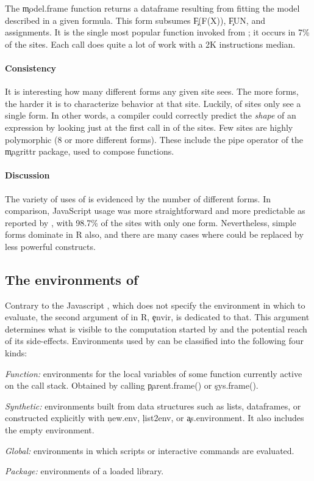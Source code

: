 \documentclass[review,screen,acmsmall,anonymous=true]{acmart}
\begin{document}
\medskip\noindent{} The \c{model.frame} function
returns a dataframe resulting from fitting the model described in a given
formula. This form subsumes \c{F(F(X))}, \c{FUN}, and assignments. It is the
single most popular function invoked from \eval; it occurs in 7\% of the sites.
Each call does quite a lot of work with a 2K instructions median.

\paragraph{Consistency} It is interesting how many different
forms any given site sees. The more forms, the harder it is to characterize
behavior at that site. Luckily, \packageNbOneMinimizedPercent of sites only see
a single form. In other words, a compiler could correctly predict the
\emph{shape} of an expression by looking just at the first call in
\packageNbOneMinimizedPercent of the sites. Few sites are highly polymorphic (8
or more different forms). These include the pipe operator of the \c{magrittr}
package, used to compose functions.

\paragraph{Discussion} The variety of uses of \eval is evidenced by the number
of different forms. In comparison, JavaScript \eval usage was more
straightforward and more predictable as reported by \citet{oopsla12b}, with
98.7\% of the sites with only one form. Nevertheless, simple forms dominate in R
also, and there are many cases where \eval could be replaced by less powerful
constructs.


\subsection{The environments of \eval}\label{sec:env}

Contrary to the Javascript \eval, which does not specify the environment in
which to evaluate, the second argument of \eval in R, \c{envir}, is dedicated to
that. This argument determines what is visible to the computation started by
\eval and the potential reach of its side-effects. Environments used by \eval
can be classified into the following four kinds:

\begin{compactitem}[---]
\item \emph{Function:} environments for the local variables of some function
  currently active on the call stack. Obtained by calling \c{parent.frame()} or
  \c{sys.frame()}.
\item \emph{Synthetic:} environments built from data structures such as lists,
  dataframes, or constructed explicitly with \c{new.env}, \c{list2env}, or
  \c{as.environment}. It also includes the empty environment.
\item \emph{Global:}  environments in which scripts or interactive commands
  are evaluated.
\item \emph{Package:}  environments of a loaded library.
\end{compactitem}
\end{document}
